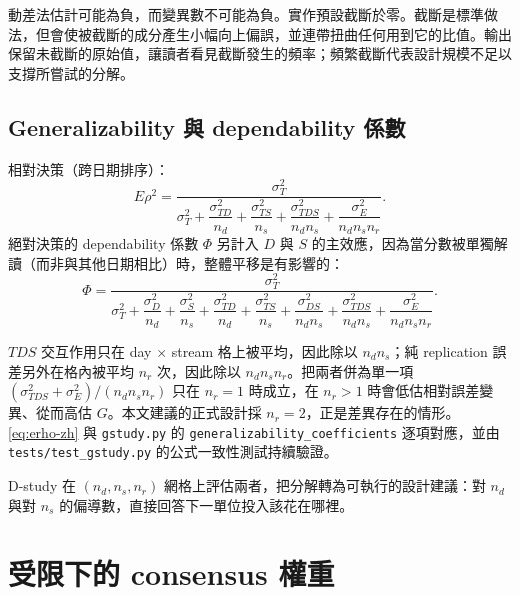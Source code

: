 \documentclass[12pt,a4paper,oneside]{article}
\begin{document}
\begin{remark}
動差法估計可能為負，而變異數不可能為負。實作預設截斷於零。截斷是標準做法，但會使被截斷的成分產生小幅向上偏誤，並連帶扭曲任何用到它的比值。輸出保留未截斷的原始值，讓讀者看見截斷發生的頻率；頻繁截斷代表設計規模不足以支撐所嘗試的分解。
\end{remark}

\subsection{Generalizability 與 dependability 係數}

相對決策（跨日期排序）：
\begin{equation}
E\rho^2=\frac{\sigma^2_T}
{\sigma^2_T+\dfrac{\sigma^2_{TD}}{n_d}+\dfrac{\sigma^2_{TS}}{n_s}
+\dfrac{\sigma^2_{TDS}}{n_dn_s}+\dfrac{\sigma^2_E}{n_dn_s n_r}} .
\label{eq:erho-zh}
\end{equation}
絕對決策的 dependability 係數 $\Phi$ 另計入 $D$ 與 $S$ 的主效應，因為當分數被單獨解讀（而非與其他日期相比）時，整體平移是有影響的：
\begin{equation}
\Phi=\frac{\sigma^2_T}
{\sigma^2_T+\dfrac{\sigma^2_D}{n_d}+\dfrac{\sigma^2_S}{n_s}
+\dfrac{\sigma^2_{TD}}{n_d}+\dfrac{\sigma^2_{TS}}{n_s}
+\dfrac{\sigma^2_{DS}}{n_dn_s}
+\dfrac{\sigma^2_{TDS}}{n_dn_s}+\dfrac{\sigma^2_E}{n_dn_sn_r}} .
\label{eq:phi-zh}
\end{equation}

\begin{remark}
$TDS$ 交互作用只在 day $\times$ stream 格上被平均，因此除以 $n_dn_s$；純 replication 誤差另外在格內被平均 $n_r$ 次，因此除以 $n_dn_sn_r$。把兩者併為單一項 $(\sigma^2_{TDS}+\sigma^2_E)/(n_dn_sn_r)$ 只在 $n_r=1$ 時成立，在 $n_r>1$ 時會低估相對誤差變異、從而高估 $G$。本文建議的正式設計採 $n_r=2$，正是差異存在的情形。\cref{eq:erho-zh} 與 \texttt{gstudy.py} 的 \texttt{generalizability\_coefficients} 逐項對應，並由 \texttt{tests/test\_gstudy.py} 的公式一致性測試持續驗證。
\end{remark}
D-study 在 $(n_d,n_s,n_r)$ 網格上評估兩者，把分解轉為可執行的設計建議：對 $n_d$ 與對 $n_s$ 的偏導數，直接回答下一單位投入該花在哪裡。

\section{受限下的 consensus 權重}
\end{document}
